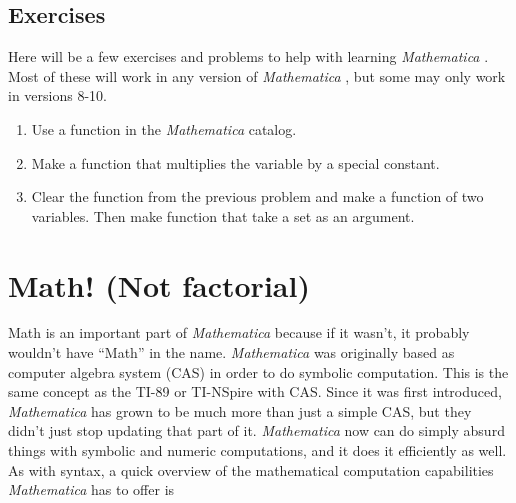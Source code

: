 \documentclass[11pt,letterpaper,twoside,titlepage]{report}
\newcommand{\Mathematica}{\textit{Mathematica} }
\begin{document}
		\chapter{Exercises}
		
			Here will be a few exercises and problems to help with learning \Mathematica.  Most of these will work in any version of \Mathematica, but some may only work in versions 8-10.
			
			\begin{enumerate}
			
				\item %
				
					Use a function in the \Mathematica catalog.
					
				\item %
				
					Make a function that multiplies the variable by a special constant.
					
				\item %
				
					Clear the function from the previous problem and make a function of two variables.  Then make function that take a set as an argument.
			
			\end{enumerate}
						
	\part{Math! (Not factorial) }
	
		Math is an important part of \Mathematica because if it wasn't, it probably wouldn't have ``Math'' in the name.  \Mathematica was originally based as computer algebra system (CAS) in order to do symbolic computation.  This is the same concept as the TI-89 or TI-NSpire with CAS.  Since it was first introduced, \Mathematica has grown to be much more than just a simple CAS, but they didn't just stop updating that part of it.  \Mathematica now can do simply absurd things with symbolic and numeric computations, and it does it efficiently as well. \\
		
		As with syntax, a quick overview of the mathematical computation capabilities \Mathematica has to offer is
		
\end{document}
